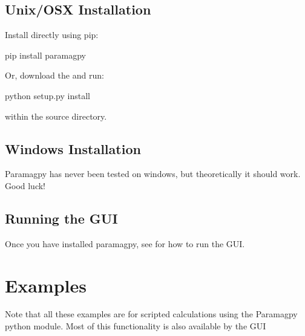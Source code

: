 \documentclass[a4paper,10pt,english,openany,oneside]{sphinxmanual}
\begin{document}
\subsection{Unix/OSX Installation}
\label{\detokenize{install:unix-osx-installation}}
\sphinxAtStartPar
Install directly using pip:

\begin{sphinxVerbatim}[commandchars=\\\{\}]
\PYGZdl{} pip install paramagpy
\end{sphinxVerbatim}

\sphinxAtStartPar
Or, download the  and run:

\begin{sphinxVerbatim}[commandchars=\\\{\}]
\PYGZdl{} python setup.py install
\end{sphinxVerbatim}

\sphinxAtStartPar
within the source directory.


\subsection{Windows Installation}
\label{\detokenize{install:windows-installation}}
\sphinxAtStartPar
Paramagpy has never been tested on windows, but theoretically it should work. Good luck!


\subsection{Running the GUI}
\label{\detokenize{install:running-the-gui}}
\sphinxAtStartPar
Once you have installed paramagpy, see {\hyperref[\detokenize{paramagpy_gui:paramagpy-gui}]{}} for how to run the GUI.


\section{Examples}
\label{\detokenize{examples/index:examples}}\label{\detokenize{examples/index:examples-index}}\label{\detokenize{examples/index::doc}}
\sphinxAtStartPar
Note that all these examples are for scripted calculations using the Paramagpy python module. Most of this functionality is also available by the GUI {\hyperref[\detokenize{paramagpy_gui:paramagpy-gui}]{}}
\end{document}

